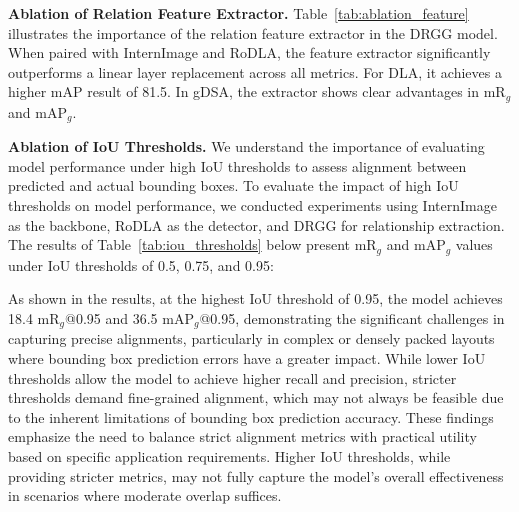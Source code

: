 \noindent \textbf{Ablation of Relation Feature Extractor.} Table~\ref{tab:ablation_feature} illustrates {the importance of the relation feature extractor in the DRGG model. When paired with InternImage and RoDLA, the feature extractor significantly outperforms a linear layer replacement across all metrics. For DLA, it achieves a higher mAP result of 81.5. In gDSA, the extractor shows clear advantages in mR$_g$ and mAP$_g$.}


{\noindent \textbf{Ablation of IoU Thresholds.}}
{We understand the importance of evaluating model performance under high IoU thresholds to assess alignment between predicted and actual bounding boxes. To evaluate the impact of high IoU thresholds on model performance, we conducted experiments using InternImage as the backbone, RoDLA as the detector, and DRGG for relationship extraction. The results of Table~\ref{tab:iou_thresholds} below present mR$_g$ and mAP$_g$ values under IoU thresholds of 0.5, 0.75, and 0.95:}

\begin{table}[ht]
\centering
\caption{{Impact of IoU thresholds on mR$_g$ and mAP$_g$.}}
\renewcommand{\arraystretch}{1.2}
\label{tab:iou_thresholds}
\end{table}
{As shown in the results, at the highest IoU threshold of 0.95, the model achieves 18.4 mR$_g$@0.95 and 36.5 mAP$_g$@0.95, demonstrating the significant challenges in capturing precise alignments, particularly in complex or densely packed layouts where bounding box prediction errors have a greater impact. While lower IoU thresholds allow the model to achieve higher recall and precision, stricter thresholds demand fine-grained alignment, which may not always be feasible due to the inherent limitations of bounding box prediction accuracy. These findings emphasize the need to balance strict alignment metrics with practical utility based on specific application requirements. Higher IoU thresholds, while providing stricter metrics, may not fully capture the model's overall effectiveness in scenarios where moderate overlap suffices.}

